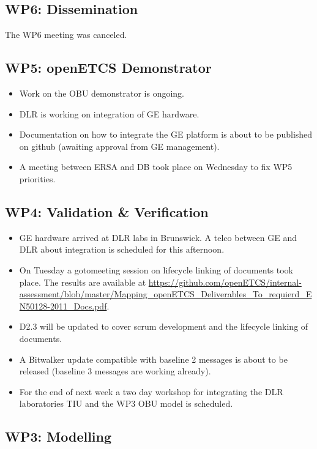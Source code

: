 \documentclass[a4paper, 11pt]{article}
\begin{document}
\subsection{WP6: Dissemination}

The WP6 meeting was canceled.
 
\subsection{WP5: openETCS Demonstrator}

\begin{itemize}
\item Work on the OBU demonstrator is ongoing.
\item DLR is working on integration of GE hardware.
\item Documentation on how to integrate the GE platform is about to be published on github (awaiting approval from GE management).
\item A meeting between ERSA and DB took place on Wednesday to fix WP5 priorities.
\end{itemize}

\subsection{WP4: Validation \& Verification}
\begin{itemize}
\item GE hardware arrived at DLR labs in Brunswick. A telco between GE and DLR about integration is scheduled for this afternoon.
\item On Tuesday a gotomeeting session on lifecycle linking of documents took place. The results are available at \url{https://github.com/openETCS/internal-assessment/blob/master/Mapping_openETCS_Deliverables_To_requierd_EN50128-2011_Docs.pdf}.
\item D2.3 will be updated to cover scrum development and the lifecycle linking of documents. 
\item A Bitwalker update compatible with baseline 2 messages is about to be released (baseline 3 messages are working already).
\item For the end of next week a two day workshop for integrating the DLR laboratories TIU and the WP3 OBU model is scheduled.
\end{itemize}

\subsection{WP3: Modelling}
\end{document}
